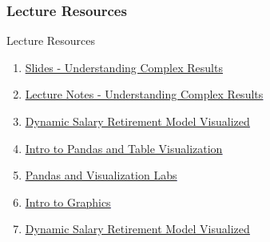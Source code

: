 \documentclass[handout, 11pt]{beamer}
\begin{document}
\begin{frame}
\frametitle{Lecture Resources}
{
\begin{block}{Lecture Resources}
\begin{enumerate}
\item \textcolor{blue}{\underline{\href{https://nickderobertis.github.io/fin-model-course/\_static/generated/pdfs/S6 Understanding Complex Results.pdf}{Slides - Understanding Complex Results}}}
\item \textcolor{blue}{\underline{\href{https://nickderobertis.github.io/fin-model-course/\_static/generated/pdfs/LN6 Understanding Complex Results.pdf}{Lecture Notes - Understanding Complex Results}}}
\item \textcolor{blue}{\underline{\href{https://nickderobertis.github.io/fin-model-course/\_static/Examples/Visualization/Excel/Dynamic Salary Retirement Model Visualized.xlsx}{Dynamic Salary Retirement Model Visualized}}}
\item \textcolor{blue}{\underline{\href{https://nickderobertis.github.io/fin-model-course/\_static/Examples/Visualization/Python/Intro to Pandas and Table Visualization.ipynb}{Intro to Pandas and Table Visualization}}}
\item \textcolor{blue}{\underline{\href{https://nickderobertis.github.io/fin-model-course/\_static/Materials for Lab Exercises/Visualization/Pandas and Visualization Labs.ipynb}{Pandas and Visualization Labs}}}
\item \textcolor{blue}{\underline{\href{https://nickderobertis.github.io/fin-model-course/\_static/Examples/Visualization/Python/Intro to Graphics.ipynb}{Intro to Graphics}}}
\item \textcolor{blue}{\underline{\href{https://nickderobertis.github.io/fin-model-course/\_static/Examples/Visualization/Python/Dynamic Salary Retirement Model Visualized.ipynb}{Dynamic Salary Retirement Model Visualized}}}
\end{enumerate}
\vfill
\end{block}
}
\label{frames:resources}
\end{frame}
\end{document}
